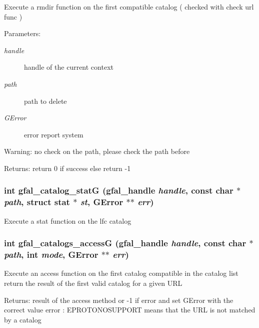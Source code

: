 Execute a rmdir function on the first compatible catalog ( checked with check url func ) \begin{Desc}
\item[Parameters:]
\begin{description}
\item[{\em handle}]handle of the current context \item[{\em path}]path to delete \item[{\em GError}]error report system \end{description}
\end{Desc}
\begin{Desc}
\item[Warning:]no check on the path, please check the path before \end{Desc}
\begin{Desc}
\item[Returns:]return 0 if success else return -1 \end{Desc}
\subsubsection{\setlength{\rightskip}{0pt plus 5cm}int gfal\_\-catalog\_\-stat\-G (gfal\_\-handle {\em handle}, const char $\ast$ {\em path}, struct stat $\ast$ {\em st}, GError $\ast$$\ast$ {\em err})}\label{gfal__common__catalog_8c_28ca68c00e4a67bc158975ef3e4f8013}


Execute a stat function on the lfc catalog 
\subsubsection{\setlength{\rightskip}{0pt plus 5cm}int gfal\_\-catalogs\_\-access\-G (gfal\_\-handle {\em handle}, const char $\ast$ {\em path}, int {\em mode}, GError $\ast$$\ast$ {\em err})}\label{gfal__common__catalog_8c_4fd85b35f2134b73207c12b54e85959d}


Execute an access function on the first catalog compatible in the catalog list return the result of the first valid catalog for a given URL \begin{Desc}
\item[Returns:]result of the access method or -1 if error and set GError with the correct value error : EPROTONOSUPPORT means that the URL is not matched by a catalog \end{Desc}
